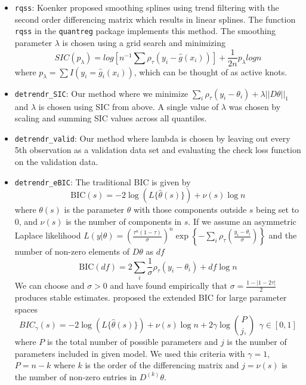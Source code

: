 \documentclass[]{article}
\begin{document}
\begin{itemize}
	\item \texttt{rqss}: \cite{KoenkerNgPortnoy1994} Koenker proposed smoothing splines using trend filtering with the second order differencing matrix which results in linear splines. The function \texttt{rqss} in the \texttt{quantreg} package implements this method. The smoothing parameter $\lambda$ is chosen using a grid search and minimizing 
	\begin{equation}
	SIC(p_{\lambda}) = log[n^{-1}\sum\rho_{\tau}(y_i - \widehat{g}(x_i))] + \frac{1}{2n}p_{\lambda}log n
	\end{equation}
	where $p_{\lambda} = \sum I(y_i = \widehat{g}_i(x_i))$, which can be thought of as active knots.
	
	\item \texttt{detrendr\_SIC}: Our method where we minimize
	$\sum_i\rho_{\tau}(y_i - \theta_i) + \lambda||D\theta||_1$ and $\lambda$ is chosen using SIC from above. A single value of $\lambda$ was chosen by scaling and summing SIC values across all quantiles. 
	\item \texttt{detrendr\_valid}: Our method where lambda is chosen by leaving out every 5th observation as a validation data set and evaluating the check loss function on the validation data.
	\item \texttt{detrendr\_eBIC}:   The traditional BIC is given by 
	\begin{equation}
	\mbox{BIC}(s) = -2\log(L\{\hat{\theta}(s)\}) + \nu(s)\log n 
	\end{equation}	
	where $\theta(s)$ is the parameter $\theta$ with those components outside $s$ being set to 0, and $\nu(s)$ is the number of components in $s$. If we assume an asymmetric Laplace likelihood $L(y|\theta) = \left(\frac{\tau^n(1-\tau)}{\sigma}\right)^n\exp\left\{-\sum_i\rho_\tau(\frac{y_i - \theta_i}{\sigma})\right\}$ and the number of non-zero elements of $D\theta$ as $df$
	\begin{equation}
	\mbox{BIC}(df) = 2\sum_i\frac{1}{\sigma}\rho_{\tau}(y_i-\theta_i) + df\log n
	\end{equation} 
	We can choose and $\sigma>0$ and have found empirically that $\sigma =  \frac{1-|1-2\tau|}{2}$ produces stable estimates. \cite{chen2008} proposed the extended BIC for large parameter spaces 
	\begin{equation}
	BIC_{\gamma}(s) = -2\log(L\{\hat{\theta}(s)\}) + \nu(s)\log n  + 2\gamma\log{P\choose j,}~~\gamma \in [0,1]
	\end{equation}
	where $P$ is the total number of possible parameters and $j$ is the number of parameters included in given model. We used this criteria with $\gamma = 1$, $P=n-k$ where $k$ is the order of the differencing matrix and $j = \nu(s)$ is the number of non-zero entries in $D^{(k)}\theta$. 
	
\end{itemize}
\end{document}
